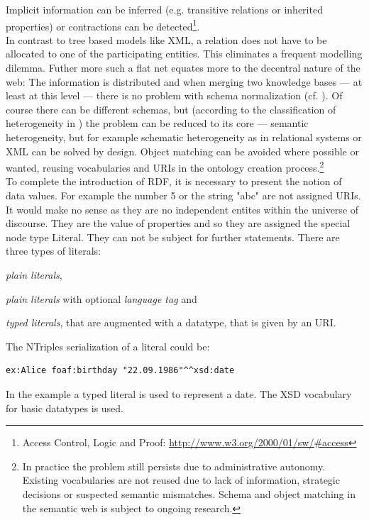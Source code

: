 Implicit information can be inferred (e.g. transitive relations or inherited properties) or contractions can be detected\footnote{Access Control, Logic and Proof: \url{http://www.w3.org/2000/01/sw/\#access}}.\\
In contrast to tree based models like XML, a relation does not have to be allocated to one of the participating entities. 
This eliminates a frequent modelling dilemma. 
Futher more such a flat net equates more to the decentral nature of the web: The information is distributed and when merging two knowledge bases --- at least at this level --- there is no problem with schema normalization (cf. \cite{hitzler}). 
Of course there can be different schemas, but (according to the classification of heterogeneity in \cite{ouksel}) the problem can be reduced to its core --- semantic heterogeneity, but for example schematic heterogeneity as in relational systems or XML can be solved by design. 
Object matching can be avoided where possible or wanted, reusing vocabularies and URIs in the ontology creation process.\footnote{In practice the problem still persists due to administrative autonomy. 
Existing vocabularies are not reused due to lack of information, strategic decisions or suspected semantic mismatches. 
Schema and object matching in the semantic web is subject to ongoing research.}\\
To complete the introduction of RDF, it is necessary to present the notion of data values. For example the number 5 or the string "abc" are not assigned URIs. 
It would make no sense as they are no independent entites within the universe of discourse. 
They are the value of properties and so they are assigned the special node type  Literal. 
They can not be subject for further statements. 
There are three types of literals:
\begin{compactitem}
\item \textit{plain literals},
\item \textit{plain literals} with optional \textit{language tag} and 
\item \textit{typed literals}, that are augmented with a datatype, that is given by an URI.
\end{compactitem}
\vspace{0.2ex}
The NTriples serialization of a literal could be:

\begin{lstlisting}[style=N3]
ex:Alice foaf:birthday "22.09.1986"^^xsd:date
\end{lstlisting}
In the example a typed literal is used to represent a date. 
The XSD vocabulary for basic datatypes is used.

